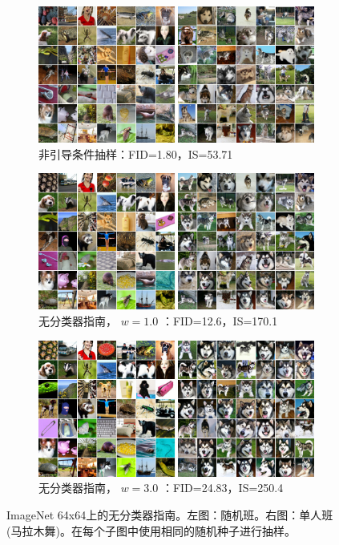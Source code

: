 \documentclass{article}
\begin{document}
 \begin{figure}[H]
     \centering
     \begin{subfigure}[b]{\textwidth}
         \centering
         \includegraphics[width=0.9\linewidth]{images/guidance_figure_1_minus0.jpg}
         \caption{
非引导条件抽样：FID=1.80，IS=53.71}
     \end{subfigure}
     \begin{subfigure}[b]{\textwidth}
         \centering
         \includegraphics[width=0.9\linewidth]{images/guidance_figure_2_minus1.jpg}
         \caption{
无分类器指南， $w=1.0$ ：FID=12.6，IS=170.1}
     \end{subfigure}
     \begin{subfigure}[b]{\textwidth}
         \centering
         \includegraphics[width=0.9\linewidth]{images/guidance_figure_4_minus3.jpg}
         \caption{
无分类器指南， $w=3.0$ ：FID=24.83，IS=250.4}
     \end{subfigure}
        \caption{
ImageNet 64x64上的无分类器指南。左图：随机班。右图：单人班(马拉木舞)。在每个子图中使用相同的随机种子进行抽样。}
        \label{fig:i64_samples}
\end{figure} 
\end{document}
